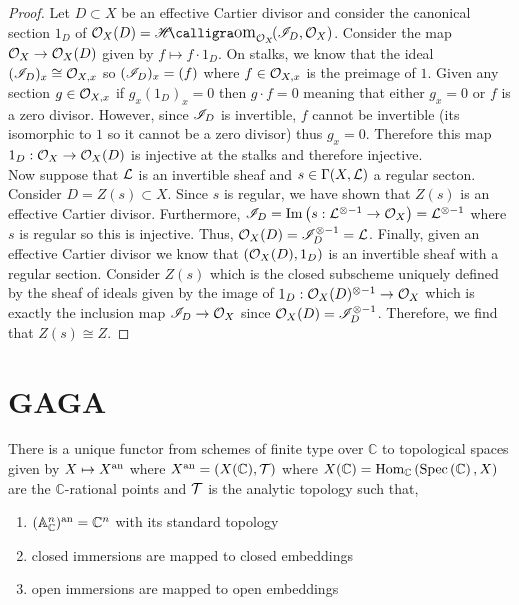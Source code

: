 \documentclass[12pt]{article}
\begin{document}
\begin{proof}
Let $D \subset X$ be an effective Cartier divisor and consider the canonical section $1_D$ of $\struct{X}(D) = \shHomover{\struct{X}}{\I_D}{\struct{X}}$. Consider the map $\mathcal{O}_{X} \to \mathcal{O}_{X}(D)$ given by $f \mapsto f \cdot 1_D$. On stalks, we know that the ideal $(\mathscr{I}_D)_x \cong \mathcal{O}_{X, x}$ so $(\mathscr{I}_D)_x = (f)$ where $f \in \mathcal{O}_{X, x}$ is the preimage of $1$. Given any section $g \in \mathcal{O}_{X, x}$ if $g_x (1_D)_x = 0$ then $g \cdot f = 0$ meaning that either $g_x = 0$ or $f$ is a zero divisor. However, since $\mathscr{I}_D$ is invertible, $f$ cannot be invertible (its isomorphic to $1$ so it cannot be a zero divisor) thus $g_x = 0$. Therefore this map $1_D : \mathcal{O}_{X} \to \mathcal{O}_{X}(D)$ is injective at the stalks and therefore injective.
\bigskip\\
Now suppose that $\mathcal{L}$ is an invertible sheaf and $s \in \Gamma(X, \mathcal{L})$ a regular secton. Consider $D = Z(s) \subset X$. Since $s$ is regular, we have shown that $Z(s)$ is an effective Cartier divisor. Furthermore, $\mathscr{I}_D = \mathrm{Im}\left( s : \mathcal{L}^{\otimes - 1} \to \mathcal{O}_{X} \right) = \mathcal{L}^{\otimes - 1}$ where $s$ is regular so this is injective. Thus, $\mathcal{O}_{X}(D) = \mathscr{I}_D^{\otimes - 1} = \mathcal{L}$. Finally, given an effective Cartier divisor we know that $(\mathcal{O}_{X}(D), 1_D)$ is an invertible sheaf with a regular section. Consider $Z(s)$ which is the closed subscheme uniquely defined by the sheaf of ideals given by the image of $1_D : \mathcal{O}_{X}(D)^{\otimes -1} \to \mathcal{O}_{X}$ which is exactly the inclusion map $\mathscr{I}_D \to \mathcal{O}_{X}$ since $\mathcal{O}_{X}(D) = \mathscr{I}_D^{\otimes -1}$. Therefore, we find that $Z(s) \cong Z$. 
\end{proof}


\section{GAGA}

\renewcommand{\C}{\mathbb{C}}

\begin{theorem}
There is a unique functor from schemes of finite type over $\C$ to topological spaces given by $X \mapsto X^{\mathrm{an}}$ where $X^\an = (X(\C), \T)$ where $X(\C) = \Homover{\C}{\Spec{\C}}{X}$ are the $\C$-rational points and $\mathcal{T}$ is the analytic topology such that,
\begin{enumerate}
\item $(\A^n_\C)^\an = \C^n$ with its standard topology
\item closed immersions are mapped to closed embeddings
\item open immersions are mapped to open embeddings
\end{enumerate}
\end{theorem}
\end{document}

